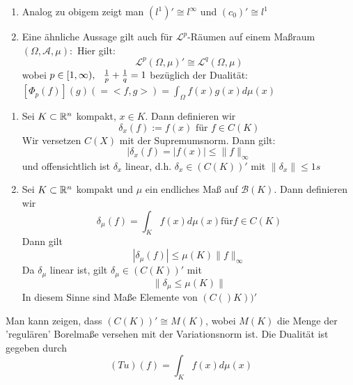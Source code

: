 \begin{bemerkung}
	\begin{enumerate}[label=\alph*\upshape)]
		\item Analog zu obigem zeigt man $(l^{1})' \cong l^{\infty}$ und $(c_{0})' \cong l^{1}$
		\item Eine ähnliche Aussage gilt auch für $\mathcal{L}^{p}$-Räumen auf einem Ma{\ss}raum $(\Omega, \mathcal{A}, \mu):$
			Hier gilt:
			\[ \mathcal{L}^{p}(\Omega, \mu)' \cong \mathcal{L}^{q}(\Omega, \mu) \]
			wobei $p \in [1, \infty), \hspace{0.25cm} \frac{1}{p} + \frac{1}{q} = 1$ bezüglich der Dualität: $[\Phi_{p}(f)](g) (= <f, g>) = \int_{\Omega} f(x) g(x) d\mu(x)$ 
	\end{enumerate}	
\end{bemerkung}

\begin{beispiel}
	\begin{enumerate}[label=\alph*\upshape)]
		\item Sei $K \subset \mathbb{R}^{n}$ kompakt, $x \in K$. Dann definieren wir
			\[ \delta_{x}(f) := f(x) \text{ für } f \in C(K) \]
			Wir versetzen $C(X)$ mit der Supremumsnorm. Dann gilt:
			\[ |\delta_{x}(f) = | f(x) | \leq \| f \|_{\infty} \]
			und offensichtlich ist $\delta_{x}$ linear, d.h. $\delta_{x} \in ( C(K) )'$ mit $\| \delta_{x} \| \leq 1s$
		\item Sei $K \subset \mathbb{R}^{n}$ kompakt und $\mu$ ein endliches Ma{\ss} auf $\mathcal{B}(K)$. Dann definieren wir 
			\[ \delta_{\mu}(f) = \int_{K} f(x) d\mu(x) \text{für} f \in C(K) \]
			Dann gilt
			\[ | \delta_{\mu} (f) | \leq \mu(K) \| f \| _{\infty} \]
			Da $\delta_{\mu}$ linear ist, gilt $\delta_{\mu}\in (C(K))'$ mit
			\[ \| \delta_{\mu} \leq \mu (K) \| \]
			In diesem Sinne sind Ma{\ss}e Elemente von $(C()K))'$
	\end{enumerate}	
\end{beispiel}

\begin{bemerkung}
	Man kann zeigen, dass $(C(K))' \cong M(K)$, wobei $M(K)$ die Menge der 'regulären' Borelma{\ss}e versehen mit der Variationsnorm ist. Die Dualität ist gegeben durch
	\[ (T u)(f) = \int_{K} f(x) d\mu(x) \]
\end{bemerkung}























